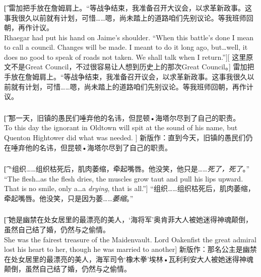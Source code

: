 \documentclass[12pt,a4paper]{article}
\begin{document}
\subsubsection{}\t[
	雷加把手放在詹姆肩上。“等战争结束，我准备召开大议会，以求革新政事。这事我很久以前就有计划，可惜……嗯，尚未踏上的道路咱们先别议论。等我班师回朝，再作计议。\\
	Rhaegar had put his hand on Jaime's shoulder. “When this battle's done I mean to call a council. Changes will be made. I meant to do it long ago, but\ldots well, it does no good to speak of roads not taken. We shall talk when I return.”][
	这里原文不是Great Council，不过很容易让人想到历史上的那次Great Council。]
	雷加把手放在詹姆肩上。“等战争结束，我准备召开议会，以求革新政事。这事我很久以前就有计划，可惜……嗯，尚未踏上的道路咱们先别议论。等我班师回朝，再作计议。
	
\subsubsection{}\t[
	那一天，旧镇的愚民们唾弃他的名讳，但昆顿•海塔尔尽到了自己的职责。\\
	To this day the ignorant in Oldtown will spit at the sound of his name, but Quenton Hightower did what was needed. ]
	新版作：直到今天，旧镇的愚民们仍在唾弃他的名讳，但昆顿•海塔尔尽到了自己的职责。
	
\subsubsection{}\t[
	“组织……组织枯死后，肌肉萎缩，牵起嘴唇。他没笑，他只是……\emph{死了，死了}。”\\
	“The flesh\ldots as the flesh dries, the muscles grow taut and pull his lips upward. That is no smile, only a\ldots a \emph{drying}, that is all.”]
	“组织……组织枯死后，肌肉萎缩，牵起嘴唇。他没笑，只是因为萎……\emph{萎缩}。”
	
\subsubsection{}\label{4.8.5}\t[
	她是幽禁在处女居里的最漂亮的美人，‘海将军’奥肯菲大人被她迷得神魂颠倒，虽然自己结了婚，仍然与之偷情。\\
	She was the fairest treasure of the Maidenvault. Lord Oakenfist the great admiral lost his heart to her, though he was married to another]
	新版作：那名公主是幽禁在处女居里的最漂亮的美人，海军司令‘橡木拳’埃林•瓦利利安大人被她迷得神魂颠倒，虽然自己结了婚，仍然与之偷情。
	
\end{document}

